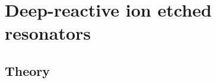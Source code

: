 \label{part:DRIE}







\part{Deep-reactive ion etched resonators\protect{}}
\label{chapter:Resonators}

\chapter{Theory}
  \label{ch:theory}

